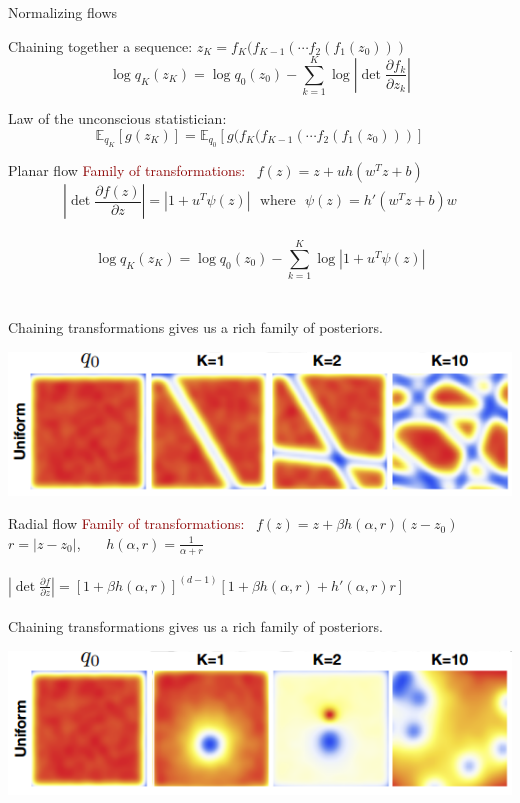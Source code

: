 \documentclass[unicode,11pt]{beamer}
\begin{document}
\begin{frame}[fragile]{Normalizing flows}

  Chaining together a sequence: $z_K = f_K ( f_{K−1} ( \cdots f_2 ( f_1(z_0)))$\\
  $$\log q_K(z_K) = \log q_0(z_0) − \sum_{k=1}^K \log \left\vert \det \frac{\partial f_k}{\partial z_k} \right\vert $$

  Law of the unconscious statistician:\\
  $$\mathbb{E}_{q_K} \left[g(z_K)\right] = \mathbb{E}_{q_0} \left[ g(f_K ( f_{K−1} ( \cdots f_2 ( f_1(z_0))) \right] $$
\end{frame}


\begin{frame}[fragile]{Planar flow}
  \textcolor{darkred}{Family of transformations:} ~$f(z) = z + uh\left( w^T z + b \right)$\\
  $$ \left\vert \det \frac{\partial f(z)}{\partial z} \right\vert = \left\vert 1 + u^T \psi(z)
  \right\vert ~~~\text{where}~~~ \psi(z) = h'(w^Tz + b)w$$ \\
  $$\log q_K(z_K) = \log q_0(z_0) − \sum_{k=1}^K \log \left\vert 1 + u^T \psi(z) \right\vert $$\\
  ~\\
  Chaining transformations gives us a rich family of posteriors.
  \begin{center}
    \includegraphics[width=.8\textwidth]{images/planar_flow}
  \end{center}
\end{frame}


\begin{frame}[fragile]{Radial flow}
  \textcolor{darkred}{Family of transformations:} ~$f(z) = z + \beta h(\alpha, r)(z-z_0)$\\
  \hspace{12em}$r = \vert z-z_0 \vert$,~~~ $h(\alpha, r) = \frac{1}{\alpha + r}$\\
  ~\\
  $\left\vert \det \frac{\partial f}{\partial z} \right\vert = [1 + \beta h(\alpha, r)]^{(d-1)}
  [1 + \beta h(\alpha, r) + h'(\alpha, r) r]$\\
  ~\\
  Chaining transformations gives us a rich family of posteriors.
  \begin{center}
    \includegraphics[width=.8\textwidth]{images/radial_flow}
  \end{center}
\end{frame}
\end{document}
